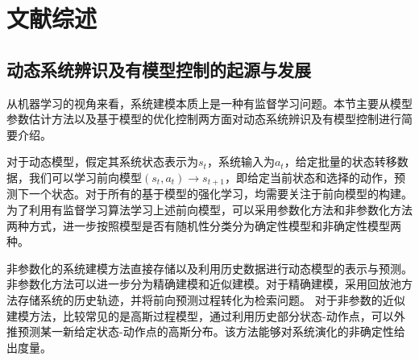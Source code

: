 \chapter{文献综述}
    



\section{动态系统辨识及有模型控制的起源与发展}


从机器学习的视角来看，系统建模本质上是一种有监督学习问题\cite{jordan1992forward}。本节主要从模型参数估计方法以及基于模型的优化控制两方面对动态系统辨识及有模型控制进行简要介绍。

对于动态模型，假定其系统状态表示为$s_t$，系统输入为$a_t$，给定批量的状态转移数据，我们可以学习前向模型$\left(s_t, a_t\right) \rightarrow s_{t+1}$，即给定当前状态和选择的动作，预测下一个状态。对于所有的基于模型的强化学习，均需要关注于前向模型的构建。为了利用有监督学习算法学习上述前向模型，可以采用参数化方法和非参数化方法两种方式，进一步按照模型是否有随机性分类分为确定性模型和非确定性模型两种。

非参数化的系统建模方法直接存储以及利用历史数据进行动态模型的表示与预测。
非参数化方法可以进一步分为精确建模和近似建模。对于精确建模，采用回放池\cite{lin1992memory}方法存储系统的历史轨迹，并将前向预测过程转化为检索问题。
对于非参数的近似建模方法，比较常见的是高斯过程模型\cite{deisenroth2011pilco,deisenroth2011pilco}，通过利用历史部分状态-动作点，可以外推预测某一新给定状态-动作点的高斯分布。该方法能够对系统演化的非确定性给出度量。

